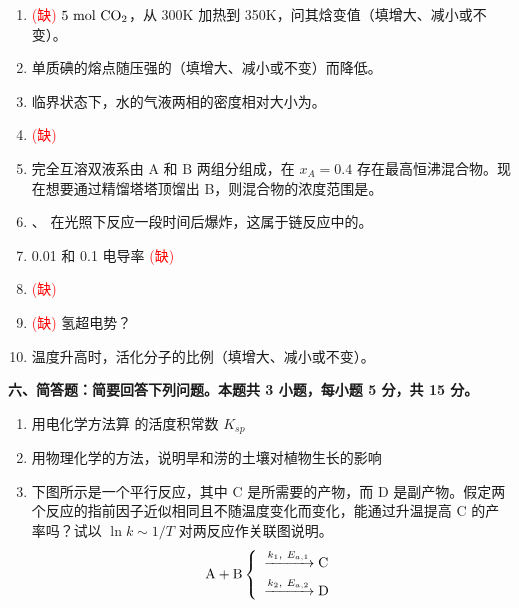 \begin{enumerate}[label=\arabic*., itemsep=1.5ex]
    \item \textcolor{red}{(缺)} $5\ \text{mol}\ \ce{CO2}$，从 300K 加热到 350K，问其焓变值\underline{\qquad\qquad\qquad}（填增大、减小或不变）。
    
    \item 单质碘的熔点随压强的\underline{\qquad\qquad\qquad}（填增大、减小或不变）而降低。
    
    \item 临界状态下，水的气液两相的密度相对大小为\underline{\qquad\qquad\qquad}。
    
    \item \textcolor{red}{(缺)}
    
    \item 完全互溶双液系由 A 和 B 两组分组成，在 $x_A=0.4$ 存在最高恒沸混合物。现在想要通过精馏塔塔顶馏出 B，则混合物的浓度范围是\underline{\qquad\qquad\qquad}。
    
    \item {}、 在光照下反应一段时间后爆炸，这属于链反应中的\underline{\qquad\qquad\qquad}。
    
    \item 0.01 和 0.1 电导率 \textcolor{red}{(缺)}
    
    \item \textcolor{red}{(缺)}
    
    \item \textcolor{red}{(缺)} 氢超电势？
    
    \item 温度升高时，活化分子的比例\underline{\qquad\qquad\qquad}（填增大、减小或不变）。
\end{enumerate}

\vspace{0.5cm}
\noindent\textbf{六、简答题：简要回答下列问题。本题共 3 小题，每小题 5 分，共 15 分。}

\begin{enumerate}[label=\arabic*., itemsep=1.5ex]
    \item 用电化学方法算  的活度积常数 $K_{sp}$
    
    \item 用物理化学的方法，说明旱和涝的土壤对植物生长的影响
    
    \item 下图所示是一个平行反应，其中 C 是所需要的产物，而 D 是副产物。假定两个反应的指前因子近似相同且不随温度变化而变化，能通过升温提高 C 的产率吗？试以 $\ln k \sim 1/T$ 对两反应作关联图说明。
    \[
    \ce{A + B} 
    \left\{
    \begin{array}{l}
        \xrightarrow{k_1,\ E_{a,1}} \ce{C} \\[1ex]
        \xrightarrow{k_2,\ E_{a,2}} \ce{D}
    \end{array}
    \right.
    \]
\end{enumerate}

